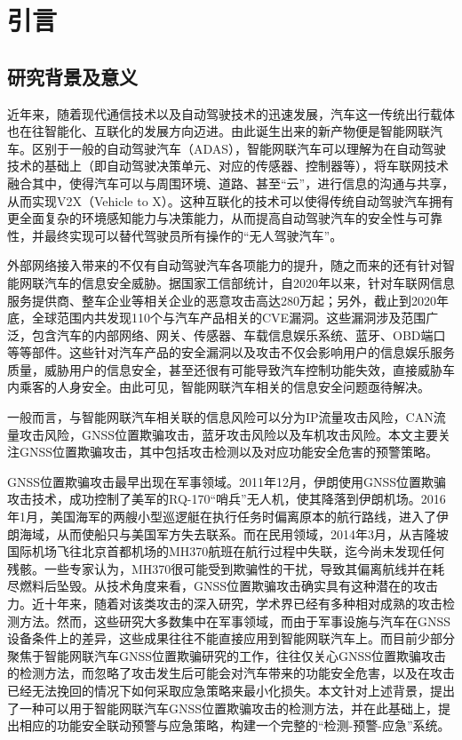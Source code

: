 \section{引言}

\subsection{研究背景及意义}
近年来，随着现代通信技术以及自动驾驶技术的迅速发展，汽车这一传统出行载体也在往智能化、互联化的发展方向迈进。由此诞生出来的新产物便是智能网联汽车。区别于一般的自动驾驶汽车（ADAS），智能网联汽车可以理解为在自动驾驶技术的基础上（即自动驾驶决策单元、对应的传感器、控制器等），将车联网技术融合其中，使得汽车可以与周围环境、道路、甚至“云”，进行信息的沟通与共享，从而实现V2X（Vehicle to X）\cite{郝晶晶2021智能网联汽车信息安全威胁识别和防护方法研究}。这种互联化的技术可以使得传统自动驾驶汽车拥有更全面复杂的环境感知能力与决策能力，从而提高自动驾驶汽车的安全性与可靠性，并最终实现可以替代驾驶员所有操作的“无人驾驶汽车”。

外部网络接入带来的不仅有自动驾驶汽车各项能力的提升，随之而来的还有针对智能网联汽车的信息安全威胁。据国家工信部统计，自2020年以来，针对车联网信息服务提供商、整车企业等相关企业的恶意攻击高达280万起\cite{智能网联汽车安全渗透白皮书2.0_2021}；另外，截止到2020年底，全球范围内共发现110个与汽车产品相关的CVE漏洞。这些漏洞涉及范围广泛，包含汽车的内部网络、网关、传感器、车载信息娱乐系统、蓝牙、OBD端口等等部件。这些针对汽车产品的安全漏洞以及攻击不仅会影响用户的信息娱乐服务质量，威胁用户的信息安全，甚至还很有可能导致汽车控制功能失效，直接威胁车内乘客的人身安全。由此可见，智能网联汽车相关的信息安全问题亟待解决。

一般而言，与智能网联汽车相关联的信息风险可以分为IP流量攻击风险，CAN流量攻击风险，GNSS位置欺骗攻击，蓝牙攻击风险以及车机攻击风险\cite{宋昊辰2020智能网联汽车信息安全综述}。本文主要关注GNSS位置欺骗攻击，其中包括攻击检测以及对应功能安全危害的预警策略。

GNSS位置欺骗攻击最早出现在军事领域。2011年12月，伊朗使用GNSS位置欺骗攻击技术，成功控制了美军的RQ-170“哨兵”无人机，使其降落到伊朗机场。2016年1月，美国海军的两艘小型巡逻艇在执行任务时偏离原本的航行路线，进入了伊朗海域，从而使船只与美国军方失去联系。而在民用领域，2014年3月，从吉隆坡国际机场飞往北京首都机场的MH370航班在航行过程中失联，迄今尚未发现任何残骸。一些专家认为，MH370很可能受到欺骗性的干扰，导致其偏离航线并在耗尽燃料后坠毁。从技术角度来看，GNSS位置欺骗攻击确实具有这种潜在的攻击力\cite{bian2017research}。近十年来，随着对该类攻击的深入研究，学术界已经有多种相对成熟的攻击检测方法。然而，这些研究大多数集中在军事领域，而由于军事设施与汽车在GNSS设备条件上的差异，这些成果往往不能直接应用到智能网联汽车上。而目前少部分聚焦于智能网联汽车GNSS位置欺骗研究的工作，往往仅关心GNSS位置欺骗攻击的检测方法，而忽略了攻击发生后可能会对汽车带来的功能安全危害，以及在攻击已经无法挽回的情况下如何采取应急策略来最小化损失。本文针对上述背景，提出了一种可以用于智能网联汽车GNSS位置欺骗攻击的检测方法，并在此基础上，提出相应的功能安全联动预警与应急策略，构建一个完整的“检测-预警-应急”系统。

